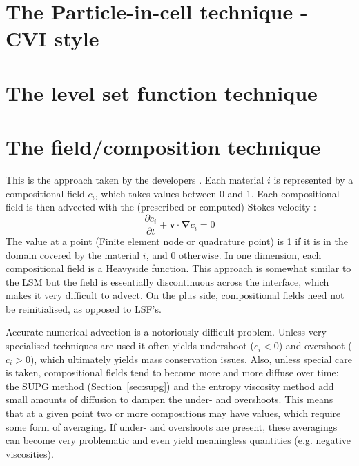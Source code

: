 

\section{The Particle-in-cell technique - CVI style}\label{sec:cvi}


\section{The level set function technique}



\section{The field/composition technique \label{sec:compfield}}

This is the approach taken by the \aspect{} developers \cite{krhb12,hedg17}. 
Each material $i$ is represented by a compositional field $c_i$, 
which takes values between 0 and 1.
Each compositional field is then advected with the (prescribed or computed) Stokes velocity \cite{chri92}:
\begin{equation}
\frac{\partial c_i}{\partial t} + {\bm v}\cdot {\bm \nabla }c_i = 0
\end{equation}
The value at a point (Finite element node or quadrature point) is 1 if it is in the 
domain covered by the material $i$, and 0 otherwise.
In one dimension, each compositional field is a Heavyside function. 
This approach is somewhat similar to the LSM but the field is essentially 
discontinuous across the interface, which makes it very difficult to advect.  
On the plus side, compositional fields need not be reinitialised, as opposed to LSF's.

Accurate numerical advection is a notoriously difficult problem. Unless very specialised 
techniques are used it often yields undershoot ($c_i<0$) and overshoot ($c_i>0$), which 
ultimately yields mass conservation issues. Also, unless special care is taken, 
compositional fields tend to become more and more diffuse over time: the SUPG method (Section~\ref{sec:supg})
and the entropy viscosity method \cite{krhb12,ropu19} add small amounts of diffusion to dampen the under- and 
overshoots. This means that at a given point two or more compositions may have values, 
which require some form of averaging. If under- and overshoots are present, these averagings
can become very problematic and even yield meaningless quantities (e.g. negative viscosities).

